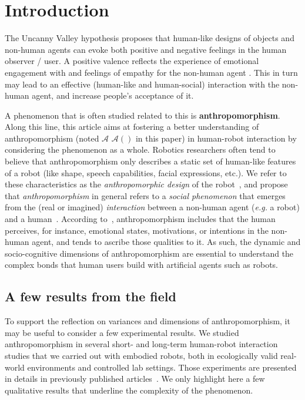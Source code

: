 \documentclass{frontiersSCNS} %
\newcommand{\eg}{\textit{e.g.}\xspace}
\newcommand{\Ant}[1][]{%
      \ifthenelse{\isempty{#1}}%
        {$\mathcal{A}$}
        {$\mathcal{A}(#1)$}
}
\begin{document}
%
%
%
%
%
%


\section{Introduction}
\label{sec:intro}

The Uncanny Valley hypothesis \citep{mori_uncanny_1970} proposes that human-like
designs of objects and non-human agents can evoke both positive and negative
feelings in the human observer / user. A positive valence reflects the
experience of emotional engagement with and feelings of empathy for the
non-human agent \citep{cheetham_human_2011}. This in turn may lead to an
effective (human-like and human-social) interaction with the non-human agent,
and increase people's acceptance of it. 

A phenomenon that is often studied related to this is \textbf{anthropomorphism}.
Along this line, this article aims at fostering a better understanding of
anthropomorphism (noted \Ant in this paper) in human-robot interaction by
considering the phenomenon as a whole. Robotics researchers often tend to
believe that anthropomorphism only describes a static set of human-like features
of a robot (like shape, speech capabilities, facial expressions, etc.). We refer
to these characteristics as the \emph{anthropomorphic design} of the
robot~\citep{fink_anthropomorphism_2012}, and propose that
\emph{anthropomorphism} in general refers to a \emph{social phenomenon} that
emerges from the (real or imagined) \emph{interaction} between a non-human agent
(\eg a robot) and a human~\citep{persson_anthropomorphism_2000}. According
to~\cite{epley_when_2008}, anthropomorphism includes that the human perceives,
for instance, emotional states, motivations, or intentions in the non-human
agent, and tends to ascribe those qualities to it.  As such, the dynamic and
socio-cognitive dimensions of anthropomorphism are essential to understand the
complex bonds that human users build with artificial agents such as robots.


\subsection{A few results from the field}
\label{sec:field-results}

To support the reflection on variances and dimensions of anthropomorphism, it may be 
useful to consider a few experimental
results. We studied anthropomorphism in several short- and long-term
human-robot interaction studies that we carried out with embodied robots, both
in ecologically valid real-world environments and controlled lab settings. Those
experiments are presented in details in previously published
articles~\citep{fink_anthropomorphic_2012, fink_living_2013, fink2014which,
lemaignan2014dynamics}. We only highlight here a few qualitative results that
underline the complexity of the phenomenon.
\end{document}
